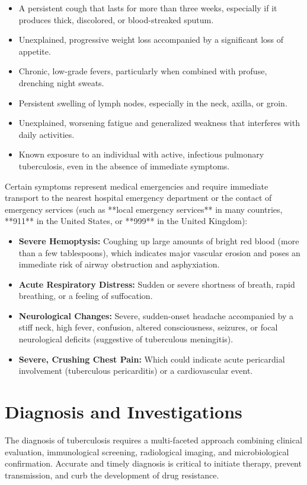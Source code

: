 \begin{itemize}
    \item A persistent cough that lasts for more than three weeks, especially if it produces thick, discolored, or blood-streaked sputum.
    \item Unexplained, progressive weight loss accompanied by a significant loss of appetite.
    \item Chronic, low-grade fevers, particularly when combined with profuse, drenching night sweats.
    \item Persistent swelling of lymph nodes, especially in the neck, axilla, or groin.
    \item Unexplained, worsening fatigue and generalized weakness that interferes with daily activities.
    \item Known exposure to an individual with active, infectious pulmonary tuberculosis, even in the absence of immediate symptoms.
\end{itemize}

Certain symptoms represent medical emergencies and require immediate transport to the nearest hospital emergency department or the contact of emergency services (such as **local emergency services** in many countries, **911** in the United States, or **999** in the United Kingdom):

\begin{itemize}
    \item \textbf{Severe Hemoptysis:} Coughing up large amounts of bright red blood (more than a few tablespoons), which indicates major vascular erosion and poses an immediate risk of airway obstruction and asphyxiation.
    \item \textbf{Acute Respiratory Distress:} Sudden or severe shortness of breath, rapid breathing, or a feeling of suffocation.
    \item \textbf{Neurological Changes:} Severe, sudden-onset headache accompanied by a stiff neck, high fever, confusion, altered consciousness, seizures, or focal neurological deficits (suggestive of tuberculous meningitis).
    \item \textbf{Severe, Crushing Chest Pain:} Which could indicate acute pericardial involvement (tuberculous pericarditis) or a cardiovascular event.
\end{itemize}

\section*{Diagnosis and Investigations}
The diagnosis of tuberculosis requires a multi-faceted approach combining clinical evaluation, immunological screening, radiological imaging, and microbiological confirmation. Accurate and timely diagnosis is critical to initiate therapy, prevent transmission, and curb the development of drug resistance.

